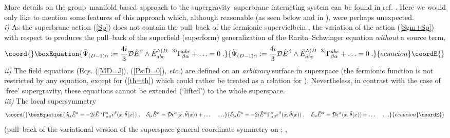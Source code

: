 \documentclass[a4paper,11pt]{article}
\begin{document}
More details on the group--manifold based approach to the 
supergravity--superbrane interacting system can be found 
in ref. \cite{BAIL}. Here we would only like to mention some 
features of this approach which, although reasonable (as seen below 
and in \cite{BdAI1,BAIL4}), were perhaps unexpected.  
\\ {\it i)} 
As the superbrane action (\ref{Sp}) does not contain the pull--back 
\coordHE{} of 
the fermionic supervielbein \coordHE{}, 
the variation of the action  (\ref{Sgm+Sp}) with respect to 
\coordHE{} produces the pull--back of the superfield (superform) 
generalization of the Rarita--Schwinger equation {\sl without} 
a source term, 
\begin{equation}\coord{}\boxEquation{
  \label{PsiD=0} 
\tilde{\Psi}_{(D-1)\alpha}:= {4i\over 3} {\cal D}\tilde{E}^{\beta}\wedge 
\tilde{E}^{\wedge (D-3)}_{abc} \Gamma^{abc}_{\beta\alpha}  
+ \ldots = 0 \; . 
}{
  \tilde{\Psi}_{(D-1)\alpha}:= {4i\over 3} {\cal D}\tilde{E}^{\beta}\wedge 
\tilde{E}^{\wedge (D-3)}_{abc} \Gamma^{abc}_{\beta\alpha}  
+ \ldots = 0 \; . 
}{ecuacion}\coordE{}\end{equation} 
{\it ii)}  
The field equations (Eqs. (\ref{MD=J}), (\ref{PsiD=0}), {\it etc.}) 
are defined 
on an {\sl arbitrary} surface \coordHE{} in superspace 
(the fermionic function  is not restricted by any equation, except for 
(\ref{th=th}) which could rather be treated as a relation for
\myHighlight{$\hat{\theta}^{\check{\alpha}} (\xi)$}\coordHE{}). Nevertheless, in 
contrast with the case of `free' supergravity, these equations 
cannot be extended (`lifted') to the whole superspace. 
\\ {\it iii)}  The local supersymmetry 
\begin{equation}\coord{}\boxEquation{
  \label{lsusy} 
\delta_{ls} \tilde{E}^a = - 2i \tilde{E}^{\alpha} \Gamma^{a}_{\alpha\beta}
\epsilon^{\beta}(x, \tilde{\theta}(x))\; , \quad 
\delta_{ls} \tilde{E}^{\alpha}= {\cal D} 
\epsilon^{\alpha}(x, \tilde{\theta}(x))+\ldots \;  \quad \ldots 
}{
  \delta_{ls} \tilde{E}^a = - 2i \tilde{E}^{\alpha} \Gamma^{a}_{\alpha\beta}
\epsilon^{\beta}(x, \tilde{\theta}(x))\; , \quad 
\delta_{ls} \tilde{E}^{\alpha}= {\cal D} 
\epsilon^{\alpha}(x, \tilde{\theta}(x))+\ldots \;  \quad \ldots 
}{ecuacion}\coordE{}\end{equation} 
(pull--back of the variational version of the superspace general coordinate 
symmetry on \coordHE{}; \coordHE{}, 
\end{document}
